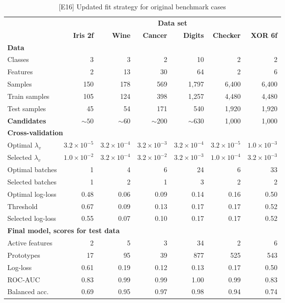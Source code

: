 \begin{table}
\caption{[E16] Updated fit strategy for original benchmark cases}
\label{tab_e16}
%
\begin{center}
\small
\begin{tabular}{|lrrrrrr|}
\hline
&\multicolumn{6}{c|}{\textbf{\hrulefill\ Data set \hrulefill}}\\
&\textbf{Iris 2f}&\textbf{Wine}&\textbf{Cancer}&\textbf{Digits}&\textbf{Checker}&\textbf{XOR 6f}\\
\multicolumn{7}{|l|}{\textbf{Data}}\\
Classes&3&3&2&10&2&2\\
Features&2&13&30&64&2&6\\
Samples&150&178&569&1,797&6,400&6,400\\
Train samples&105&124&398&1,257&4,480&4,480\\
Test samples&45&54&171&540&1,920&1,920\\
\textbf{Candidates}&$\sim50$&$\sim60$&$\sim200$&$\sim630$&1,000&1,000\\
\multicolumn{7}{|l|}{\textbf{Cross-validation}}\\
Optimal $\lambda_v$&$3.2\times10^{-5}$&$3.2\times10^{-4}$&$3.2\times10^{-3}$&$3.2\times10^{-4}$&$3.2\times10^{-5}$&$1.0\times10^{-3}$\\
Selected $\lambda_v$&$1.0\times10^{-2}$&$3.2\times10^{-4}$&$3.2\times10^{-2}$&$3.2\times10^{-3}$&$1.0\times10^{-4}$&$3.2\times10^{-3}$\\
Optimal batches&1&4&6&24&6&33\\
Selected batches&1&2&1&3&2&2\\
Optimal log-loss&0.48&0.06&0.09&0.14&0.16&0.50\\
Threshold&0.67&0.09&0.13&0.17&0.17&0.52\\
Selected log-loss&0.55&0.07&0.10&0.17&0.17&0.52\\
\multicolumn{7}{|l|}{\textbf{Final model, scores for test data}}\\
Active features&2&5&3&34&2&6\\
Prototypes&17&95&39&877&525&543\\
Log-loss&0.61&0.19&0.12&0.13&0.17&0.50\\
ROC-AUC&0.83&0.99&0.99&1.00&0.99&0.83\\
Balanced acc.&0.69&0.95&0.97&0.98&0.94&0.74\\
\hline
\end{tabular}
\end{center}
\end{table}
%
